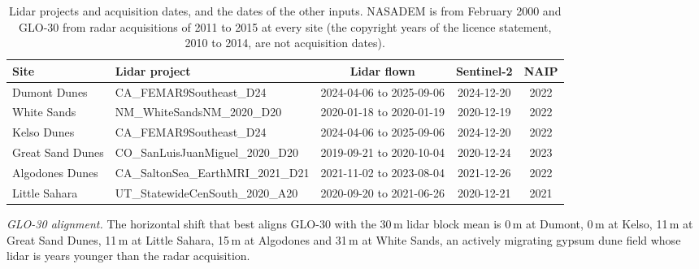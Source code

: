 \documentclass[10pt]{article}
\begin{document}
\begin{table}[H]
\caption{Lidar projects and acquisition dates, and the dates of the other inputs. NASADEM is from February 2000 and GLO-30 from radar acquisitions of 2011 to 2015 at every site (the copyright years of the licence statement, 2010 to 2014, are not acquisition dates).}
\label{tab:dates}
\centering\scriptsize
\begin{tabular}{@{}llccc@{}}
\toprule
Site & Lidar project & Lidar flown & Sentinel-2 & NAIP \\
\midrule
Dumont Dunes & CA\_FEMAR9Southeast\_D24 & 2024-04-06 to 2025-09-06 & 2024-12-20 & 2022 \\
White Sands & NM\_WhiteSandsNM\_2020\_D20 & 2020-01-18 to 2020-01-19 & 2020-12-19 & 2022 \\
Kelso Dunes & CA\_FEMAR9Southeast\_D24 & 2024-04-06 to 2025-09-06 & 2024-12-20 & 2022 \\
Great Sand Dunes & CO\_SanLuisJuanMiguel\_2020\_D20 & 2019-09-21 to 2020-10-04 & 2020-12-24 & 2023 \\
Algodones Dunes & CA\_SaltonSea\_EarthMRI\_2021\_D21 & 2021-11-02 to 2023-08-04 & 2021-12-26 & 2022 \\
Little Sahara & UT\_StatewideCenSouth\_2020\_A20 & 2020-09-20 to 2021-06-26 & 2020-12-21 & 2021 \\
\bottomrule
\end{tabular}
\end{table}

\textit{GLO-30 alignment.} The horizontal shift that best aligns GLO-30 with the 30\,m lidar block mean is 0\,m at Dumont, 0\,m at Kelso, 11\,m at Great Sand Dunes, 11\,m at Little Sahara, 15\,m at Algodones and 31\,m at White Sands, an actively migrating gypsum dune field whose lidar is years younger than the radar acquisition.
\end{document}
